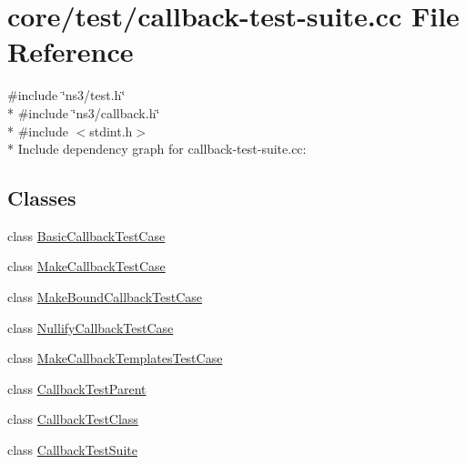 \hypertarget{callback-test-suite_8cc}{}\section{core/test/callback-\/test-\/suite.cc File Reference}
\label{callback-test-suite_8cc}
{\ttfamily \#include \char`\"{}ns3/test.\+h\char`\"{}}\\*
{\ttfamily \#include \char`\"{}ns3/callback.\+h\char`\"{}}\\*
{\ttfamily \#include $<$stdint.\+h$>$}\\*
Include dependency graph for callback-\/test-\/suite.cc\+:
\subsection*{Classes}
\begin{DoxyCompactItemize}
\item 
class \hyperlink{classBasicCallbackTestCase}{Basic\+Callback\+Test\+Case}
\item 
class \hyperlink{classMakeCallbackTestCase}{Make\+Callback\+Test\+Case}
\item 
class \hyperlink{classMakeBoundCallbackTestCase}{Make\+Bound\+Callback\+Test\+Case}
\item 
class \hyperlink{classNullifyCallbackTestCase}{Nullify\+Callback\+Test\+Case}
\item 
class \hyperlink{classMakeCallbackTemplatesTestCase}{Make\+Callback\+Templates\+Test\+Case}
\item 
class \hyperlink{classCallbackTestParent}{Callback\+Test\+Parent}
\item 
class \hyperlink{classCallbackTestClass}{Callback\+Test\+Class}
\item 
class \hyperlink{classCallbackTestSuite}{Callback\+Test\+Suite}
\end{DoxyCompactItemize}
